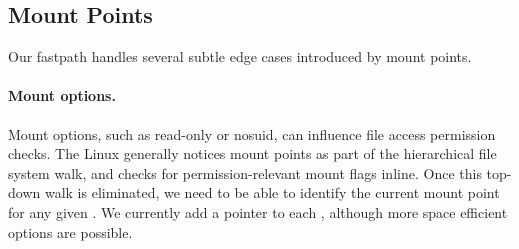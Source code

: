 \subsection{Mount Points}

Our fastpath handles several subtle edge cases introduced by mount points.

\paragraph{Mount options.}  Mount options, such as read-only or nosuid,
can influence file access permission checks.
The Linux \dcache{} generally notices mount points as part of the hierarchical file system walk,
and checks for permission-relevant mount flags inline.
Once this top-down walk is eliminated, we need to be able to identify the current mount point for any given \dentry{}.
We currently add a pointer to each \dentry{}, although more space efficient options are possible. 


